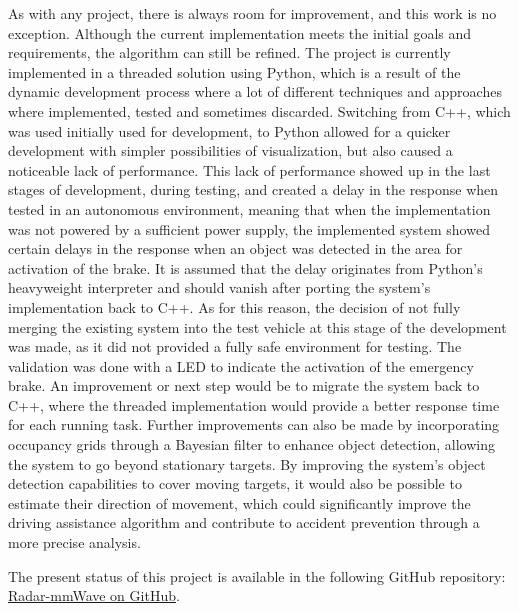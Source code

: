 \par\bigskip
As with any project, there is always room for improvement, and this work is no exception.
Although the current implementation meets the initial goals and requirements, the algorithm can still be refined.
The project is currently implemented in a threaded solution using Python, which is a result of the dynamic development process where a lot of different techniques and approaches where implemented, tested and sometimes discarded.
Switching from C++, which was used initially used for development, to Python allowed for a quicker development with simpler possibilities of visualization, but also caused a noticeable lack of performance.
This lack of performance showed up in the last stages of development, during testing, and created a delay in the response when tested in an autonomous environment, meaning that when the implementation was not powered by a sufficient power supply, the implemented system showed certain delays in the response when an object was detected in the area for activation of the brake.
It is assumed that the delay originates from Python's heavyweight interpreter and should vanish after porting the system's implementation back to C++.
As for this reason, the decision of not fully merging the existing system into the test vehicle at this stage of the development was made, as it did not provided a fully safe environment for testing.
The validation was done with a LED to indicate the activation of the emergency brake.
An improvement or next step would be to migrate the system back to C++, where the threaded implementation would provide a better response time for each running task.
Further improvements can also be made by incorporating occupancy grids through a Bayesian filter to enhance object detection, allowing the system to go beyond stationary targets.
By improving the system's object detection capabilities to cover moving targets, it would also be possible to estimate their direction of movement, which could significantly improve the driving assistance algorithm and contribute to accident prevention through a more precise analysis.
\par\bigskip
The present status of this project is available in the following GitHub repository: \href{https://github.com/LF-RoGu/Radar-mmWave}{Radar-mmWave on GitHub}.